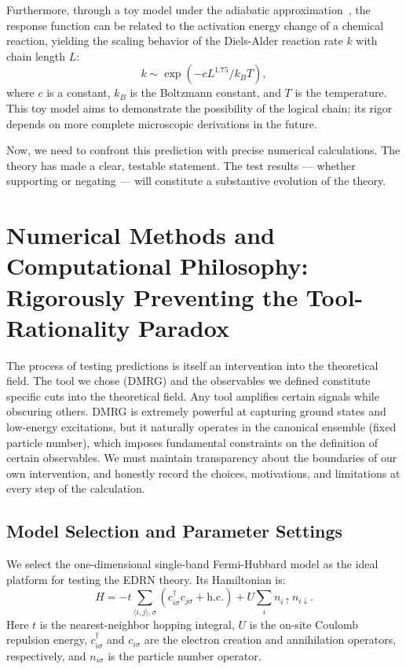 \documentclass[prb,reprint,twocolumn,superscriptaddress]{revtex4-2}
\begin{document}
Furthermore, through a toy model under the adiabatic approximation~\cite{Marcus1970,Houk1996}, the response function can be related to the activation energy change of a chemical reaction, yielding the scaling behavior of the Diels-Alder reaction rate $k$ with chain length $L$:
\begin{equation}
k \sim \exp(-c L^{1.75} / k_B T),
\end{equation}
where $c$ is a constant, $k_B$ is the Boltzmann constant, and $T$ is the temperature. This toy model aims to demonstrate the possibility of the logical chain; its rigor depends on more complete microscopic derivations in the future.

Now, we need to confront this prediction with precise numerical calculations. The theory has made a clear, testable statement. The test results --- whether supporting or negating --- will constitute a substantive evolution of the theory.

\section{Numerical Methods and Computational Philosophy: Rigorously Preventing the Tool-Rationality Paradox}\label{sec:methodology}

The process of testing predictions is itself an intervention into the theoretical field. The tool we chose (DMRG) and the observables we defined constitute specific cuts into the theoretical field. Any tool amplifies certain signals while obscuring others. DMRG is extremely powerful at capturing ground states and low-energy excitations, but it naturally operates in the canonical ensemble (fixed particle number), which imposes fundamental constraints on the definition of certain observables. We must maintain transparency about the boundaries of our own intervention, and honestly record the choices, motivations, and limitations at every step of the calculation.

\subsection{Model Selection and Parameter Settings}

We select the one-dimensional single-band Fermi-Hubbard model as the ideal platform for testing the EDRN theory. Its Hamiltonian is:
\begin{equation}
H = -t \sum_{\langle i,j\rangle,\sigma} (c_{i\sigma}^\dagger c_{j\sigma} + \mathrm{h.c.}) + U \sum_i n_{i\uparrow} n_{i\downarrow}.
\end{equation}
Here $t$ is the nearest-neighbor hopping integral, $U$ is the on-site Coulomb repulsion energy, $c_{i\sigma}^\dagger$ and $c_{i\sigma}$ are the electron creation and annihilation operators, respectively, and $n_{i\sigma}$ is the particle number operator.
\end{document}
